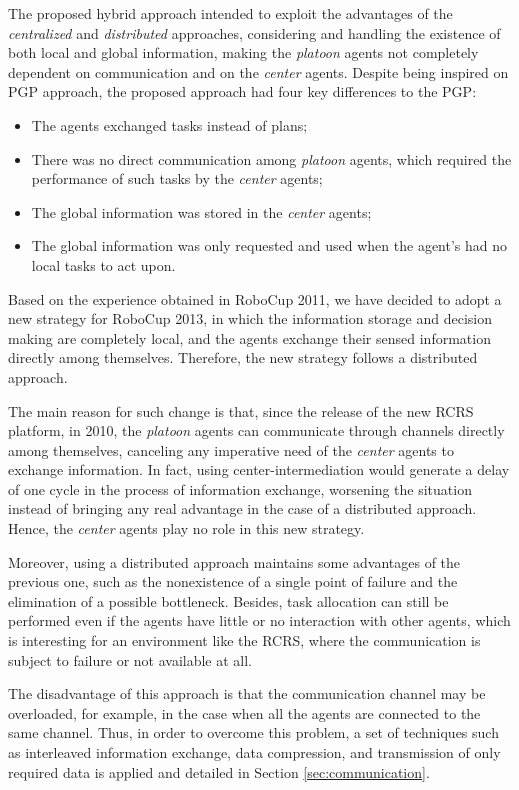 \documentclass{llncs}
\begin{document}
The proposed hybrid approach intended to exploit the advantages of the {\it centralized} and {\it distributed} approaches, considering and handling the existence of both local and global information, making the {\it platoon} agents not completely dependent on communication and on the {\it center} agents. Despite being inspired on PGP approach, the proposed approach had four key differences to the PGP:
\begin{itemize}
\item The agents exchanged tasks instead of plans;
\item There was no direct communication among {\it platoon} agents, which required the performance of such tasks by the {\it center} agents;
\item The global information was stored in the {\it center} agents;
\item The global information was only requested and used when the agent's had no local tasks to act upon.
\end{itemize}

Based on the experience obtained in RoboCup 2011, we have decided to adopt a new strategy for RoboCup 2013, in which the information storage and decision making are completely local, and the agents exchange their sensed information directly among themselves. Therefore, the new strategy follows a distributed approach.

The main reason for such change is that, since the release of the new RCRS platform, in 2010, the {\it platoon} agents can communicate through channels directly among themselves, canceling any imperative need of the {\it center} agents to exchange information. In fact, using center-intermediation would generate a delay of one cycle in the process of information exchange, worsening the situation instead of bringing any real advantage in the case of a distributed approach. Hence, the {\it center} agents play no role in this new strategy.

Moreover, using a distributed approach maintains some advantages of the previous one, such as the nonexistence of a single point of failure and the elimination of a possible bottleneck. Besides, task allocation can still be performed even if the agents have little or no interaction with other agents, which is interesting for an environment like the RCRS, where the communication is subject to failure or not available at all.

The disadvantage of this approach is that the communication channel may be overloaded, for example, in the case when all the agents are connected to the same channel. Thus, in order to overcome this problem, a set of techniques such as interleaved information exchange, data compression, and transmission of only required data is applied and detailed in Section \ref{sec:communication}.
\end{document}
